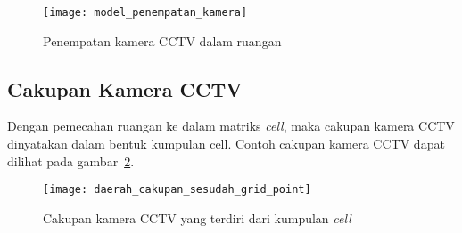 \begin{figure}[h]
	\centering  
	\texttt{[image: model\_penempatan\_kamera]}
	\caption[Penempatan kamera CCTV dalam ruangan]{Penempatan kamera CCTV dalam ruangan} 
	\label{fig:model_penempatan_kamera}
\end{figure}

\subsection{Cakupan Kamera CCTV}
Dengan pemecahan ruangan ke dalam matriks \textit{cell}, maka cakupan kamera CCTV dinyatakan dalam bentuk kumpulan cell. Contoh cakupan kamera CCTV dapat dilihat pada gambar~\ref{fig:cakupan_kamera_cctv}.

\begin{figure}[h]
	\centering  
	\texttt{[image: daerah\_cakupan\_sesudah\_grid\_point]}
	\caption[Cakupan kamera CCTV yang terdiri dari kumpulan \textit{cell}]{Cakupan kamera CCTV yang terdiri dari kumpulan \textit{cell}}
	\label{fig:cakupan_kamera_cctv}
\end{figure}

